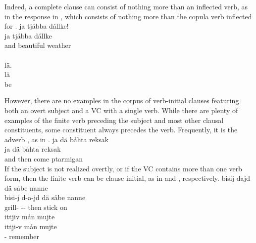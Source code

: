 Indeed, a complete clause can consist of nothing more than an inflected verb, as in the response %
in , which consists of nothing more than the copula verb inflected for .
\ea\label{missingNP5}
\glll	{} ja tjábba dállke!\\
	{} ja tjábba dállke\\
	{} and beautiful weather\BS{} \\\nopagebreak
{}\\ %
\glll	{} lä.\\
	{} lä\\
	{} be\BS{}\\\nopagebreak
{} %
\z
{} 

However, there are no examples in the corpus of verb-initial clauses featuring both an overt subject and a VC with a single verb. While there are plenty of examples of the finite verb preceding the subject and most other clausal constituents, some constituent always precedes the verb. Frequently, it is the adverb , as in . 
\ea\label{ConstOrderAdvVex1}%
\glll	ja dä båhta reksak\\
	ja dä båhta reksak\\
	and then come\BS{} ptarmigan\BS{} \\\nopagebreak
{} 
\z
If the subject is not realized overtly, or if the VC contains more than one verb form, then the finite verb can be clause initial, as in  and , respectively. 
\ea\label{ConstOrderAdvVex2}%
\glll	bisij dajd dä såbe nanne\\
	bisi-j d-a-jd dä såbe nanne\\
	grill- -- then stick\BS{} on\\\nopagebreak
{} 
\z
\ea\label{ConstOrderAdvVex3}%
\glll	ittjiv mån mujte\\
	ittji-v mån mujte\\
	-  remember\BS{} \\\nopagebreak
{} 
\z


